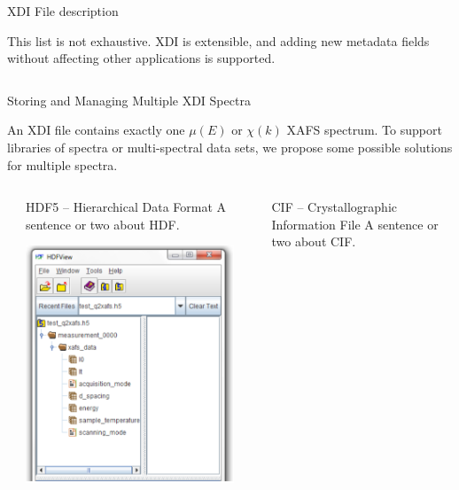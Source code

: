 \documentclass[final]{beamer}
\begin{document}
\begin{frame}{}
\begin{columns}[t]
\begin{column}{.42\linewidth}
\begin{block}{\large XDI File description}
         \hspace{3mm}
       
         This list is not exhaustive.  XDI is extensible, and adding new
         metadata fields without affecting other applications is supported.


       \end{block}
     \end{column}
   \end{columns}

   \begin{block}{\large Storing and Managing Multiple XDI Spectra}
     
     An XDI file contains exactly one $\mu(E)$ or $\chi(k)$ XAFS
     spectrum.  To support libraries of spectra or multi-spectral data
     sets, we propose some possible solutions for multiple spectra.

   \end{block}

    \begin{columns}[t]
      \begin{column}{.01\linewidth}
      \end{column}
      \begin{column}{.32\linewidth}
        \begin{block}{HDF5 -- Hierarchical Data Format}
          A sentence or two about HDF.

         \vspace{9mm}

         \begin{center}
           \includegraphics[width=0.5\linewidth]{hdf5.png}
         \end{center}
        
        \end{block}
      \end{column}
      \begin{column}{.01\linewidth}
      \end{column}
      \begin{column}{.32\linewidth}
        \begin{block}{CIF -- Crystallographic Information File}
          A sentence or two about CIF.


\end{block}
\end{column}
\end{columns}
\end{frame}
\end{document}
